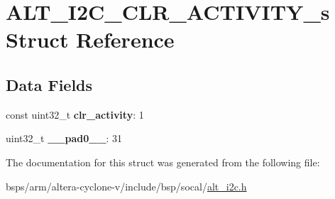 \hypertarget{structALT__I2C__CLR__ACTIVITY__s}{}\section{A\+L\+T\+\_\+\+I2\+C\+\_\+\+C\+L\+R\+\_\+\+A\+C\+T\+I\+V\+I\+T\+Y\+\_\+s Struct Reference}
\label{structALT__I2C__CLR__ACTIVITY__s}
\subsection*{Data Fields}
\begin{DoxyCompactItemize}
\item 
\mbox{\label{structALT__I2C__CLR__ACTIVITY__s_ad7dc8ac7dbd80bf81a6e2b50cec20ae2}} 
const uint32\+\_\+t {\bfseries clr\+\_\+activity}\+: 1
\item 
\mbox{\label{structALT__I2C__CLR__ACTIVITY__s_a03ade38047a2726a8b4000ec5f727dd8}} 
uint32\+\_\+t {\bfseries \+\_\+\+\_\+pad0\+\_\+\+\_\+}\+: 31
\end{DoxyCompactItemize}


The documentation for this struct was generated from the following file\+:\begin{DoxyCompactItemize}
\item 
bsps/arm/altera-\/cyclone-\/v/include/bsp/socal/\mbox{\hyperlink{socal_2alt__i2c_8h}{alt\+\_\+i2c.\+h}}\end{DoxyCompactItemize}
